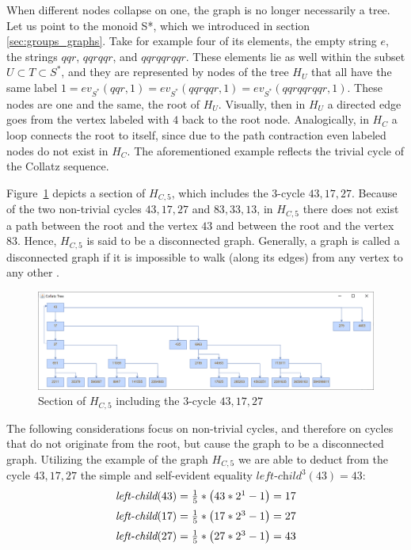 When different nodes collapse on one, the graph is no longer necessarily a tree. Let us point to the monoid S*, which we introduced in section \ref{sec:groups_graphs}. Take for example four of its elements, the empty string $e$, the strings $qqr$, $qqrqqr$, and $qqrqqrqqr$. These elements lie as well within the subset $U\subset T\subset S^*$, and they are represented by nodes of the tree $H_U$ that all have the same label $1=ev_{S^*}(qqr,1)=ev_{S^*}(qqrqqr,1)=ev_{S^*}(qqrqqrqqr,1)$. These nodes are one and the same, the root of $H_U$. Visually, then in $H_U$ a directed edge goes from the vertex labeled with $4$ back to the root node. Analogically, in $H_C$ a loop connects the root to itself, since due to the path contraction even labeled nodes do not exist in $H_C$. The  aforementioned example reflects the trivial cycle of the Collatz sequence.

\par\medskip
Figure~\ref{fig:5} depicts a section of $H_{C,5}$, which includes the $3$-cycle $43,17,27$. Because of the two non-trivial cycles $43,17,27$ and $83,33,13$, in $H_{C,5}$ there does not exist a path between the root and the vertex $43$ and between the root and the vertex $83$. Hence, $H_{C,5}$ is said to be a disconnected graph. Generally, a graph is called a disconnected graph if it is impossible to walk (along its edges) from any vertex to any other \cite[pp.~46-47]{Ref_Benjamin_Chartrand_Zhang}.

\begin{figure}
	\includegraphics[width=1.00\textwidth]{figures/h_c5a.png}
	\caption{Section of $H_{C,5}$ including the $3$-cycle $43,17,27$}
	\label{fig:5}
\end{figure}

\par\medskip
The following considerations focus on non-trivial cycles, and therefore on cycles that do not originate from the root, but cause the graph to be a disconnected graph. Utilizing the example of the graph $H_{C,5}$ we are able to deduct from the cycle $43,17,27$ the simple and self-evident equality $\textit{left-child}^3(43)=43$:
\begin{equation*}
	\begin{array}{l}
		\textit{left-child}(43)=\frac{1}{5}*\left(43*2^1-1\right)=17
		\\[\medskipamount]
		\textit{left-child}(17)=\frac{1}{5}*\left(17*2^3-1\right)=27
		\\[\medskipamount]
		\textit{left-child}(27)=\frac{1}{5}*\left(27*2^3-1\right)=43
	\end{array}
\end{equation*}

